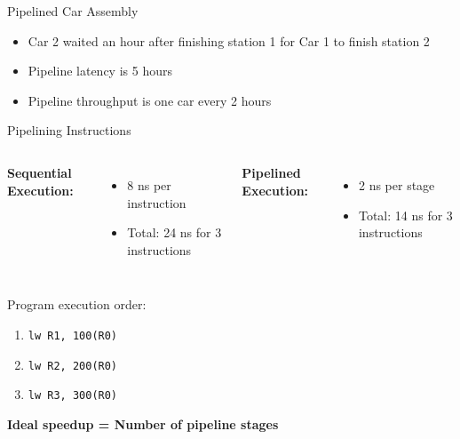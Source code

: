 \documentclass[aspectratio=169,12pt]{beamer}
\begin{document}
\begin{frame}{Pipelined Car Assembly}
    \begin{itemize}
        \item Car 2 waited an hour after finishing station 1 for Car 1 to finish station 2
        \item Pipeline latency is 5 hours
        \item Pipeline throughput is one car every 2 hours
    \end{itemize}
    
    \centering
\end{frame}

\begin{frame}{Pipelining Instructions}
    \begin{columns}
        \textbf{Sequential Execution:}
        \begin{itemize}
            \item 8 ns per instruction
            \item Total: 24 ns for 3 instructions
        \end{itemize}
        
        \textbf{Pipelined Execution:}
        \begin{itemize}
            \item 2 ns per stage
            \item Total: 14 ns for 3 instructions
        \end{itemize}
    \end{columns}
    
    \vspace{0.5cm}
    \centering
    Program execution order:
    \begin{enumerate}
        \item \texttt{lw R1, 100(R0)}
        \item \texttt{lw R2, 200(R0)}
        \item \texttt{lw R3, 300(R0)}
    \end{enumerate}
    
    \textbf{Ideal speedup = Number of pipeline stages}
\end{frame}
\end{document}
